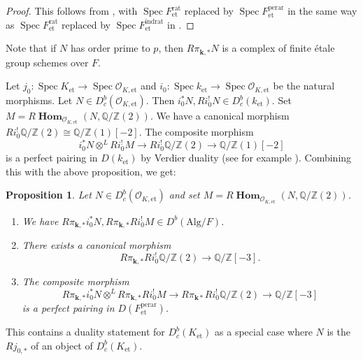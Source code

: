 \documentclass{amsart}
\newtheorem{Prop}[Thm]{Proposition}
\theoremstyle{remark}
\numberwithin{equation}{subsection}
\newcommand{\Order}{\mathcal{O}}
\newcommand{\tensor}{\mathbin{\otimes}}
\newcommand{\Z}{\mathbb{Z}}
\newcommand{\Q}{\mathbb{Q}}
\newcommand{\et}{\mathrm{et}}
\newcommand{\rat}{\mathrm{rat}}
\newcommand{\ind}{\mathrm{ind}}
\newcommand{\perar}{\mathrm{perar}}
\newcommand{\Alg}{\mathrm{Alg}}
\newcommand{\alg}[1]{\mathbf{#1}}
\DeclareMathOperator{\Spec}{Spec}
\DeclareMathOperator{\sheafhom}{\alg{Hom}}
\begin{document}
\begin{proof}
	This follows from \cite[Theorem A]{Suz22Duality},
	with $\Spec F^{\rat}_{\et}$ replaced by $\Spec F^{\perar}_{\et}$
	in the same way as $\Spec F^{\rat}_{\et}$ replaced by $\Spec F^{\ind\rat}_{\et}$
	in \cite[Theorem 2.1.5]{Suz22Duality}.
\end{proof}

Note that if $N$ has order prime to $p$,
then $R \pi_{\alg{k}, \ast} N$ is a complex of finite \'etale group schemes over $F$.

Let $j_{0} \colon \Spec K_{\et} \to \Spec \Order_{K, \et}$ and
$i_{0} \colon \Spec k_{\et} \to \Spec \Order_{K, \et}$ be the natural morphisms.
Let $N \in D^{b}_{c}(\Order_{K, \et})$.
Then $i_{0}^{\ast} N, R i_{0}^{!} N \in D^{b}_{c}(k_{\et})$.
Set $M = R \sheafhom_{\Order_{K, \et}}(N, \Q / \Z(2))$.
We have a canonical morphism
$R i_{0}^{!} \Q / \Z(2) \cong \Q / \Z(1)[-2]$.
The composite morphism
	\[
			i_{0}^{\ast} N \tensor^{L} R i_{0}^{!} M
		\to
			R i_{0}^{!} \Q / \Z(2)
		\to
			\Q / \Z(1)[-2]
	\]
is a perfect pairing in $D(k_{\et})$ by Verdier duality
(see for example \cite[Expos\'e I, Theorem 5.1]{Ill77}).
Combining this with the above proposition, we get:

\begin{Prop} \label{0059}
	Let $N \in D^{b}_{c}(\Order_{K, \et})$
	and set $M = R \sheafhom_{\Order_{K, \et}}(N, \Q / \Z(2))$.
	\begin{enumerate}
		\item \label{0196}
			We have $R \pi_{\alg{k}, \ast} i_{0}^{\ast} N, R \pi_{\alg{k}, \ast} R i_{0}^{!} M \in D^{b}(\Alg / F)$.
		\item \label{0197}
			There exists a canonical morphism
				\[
						R \pi_{\alg{k}, \ast} R i_{0}^{!} \Q / \Z(2)
					\to
						\Q / \Z[-3].
				\]
		\item \label{0198}
			The composite morphism
				\[
							R \pi_{\alg{k}, \ast} i_{0}^{\ast} N
						\tensor^{L}
							R \pi_{\alg{k}, \ast} R i_{0}^{!} M
					\to
						R \pi_{\alg{k} \ast} R i_{0}^{!} \Q / \Z(2)
					\to
						\Q / \Z[-3]
				\]
			is a perfect pairing in $D(F^{\perar}_{\et})$.
	\end{enumerate}
\end{Prop}

This contains a duality statement for $D^{b}_{c}(K_{\et})$
as a special case where $N$ is the $R j_{0, \ast}$ of an object of $D^{b}_{c}(K_{\et})$.

\end{document}
